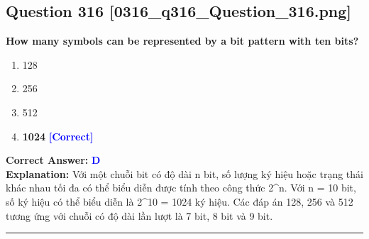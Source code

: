 \documentclass[11pt,a4paper]{article}
\begin{document}
\begin{minipage}{\textwidth}
\subsection*{Question 316 \quad \footnotesize{[0316\_q316\_Question\_316.png]}}
\noindent \textbf{How many symbols can be represented by a bit pattern with ten bits?}

\begin{enumerate}[label=\Alph*.]
    \item 128
    \item 256
    \item 512
    \item \textbf{1024} \hfill \textcolor{blue}{\textbf{[Correct]}}
\end{enumerate}

\noindent \textbf{Correct Answer:} \textcolor{blue}{\textbf{D}} \\[2pt]
\noindent \textbf{Explanation:} Với một chuỗi bit có độ dài n bit, số lượng ký hiệu hoặc trạng thái khác nhau tối đa có thể biểu diễn được tính theo công thức 2\textasciicircum{}n. Với n = 10 bit, số ký hiệu có thể biểu diễn là 2\textasciicircum{}10 = 1024 ký hiệu. Các đáp án 128, 256 và 512 tương ứng với chuỗi có độ dài lần lượt là 7 bit, 8 bit và 9 bit.

\par\vspace{0.3cm}
\hrule
\vspace{0.3cm}
\end{minipage}
\end{document}
